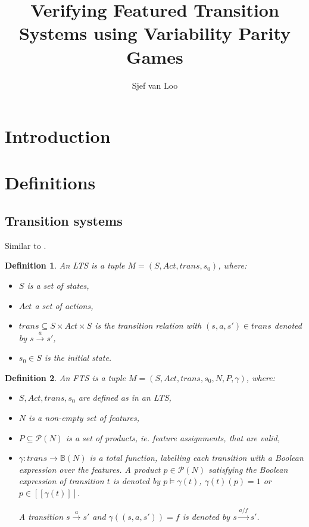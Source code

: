 \documentclass[]{article}
\title{Verifying Featured Transition Systems using Variability Parity Games}
\author{Sjef van Loo}
\newtheorem{definition}{Definition}[section]
\begin{document}
\maketitle

\section{Introduction}


\section{Definitions}
\subsection{Transition systems}
Similar to \cite{Classen2013FeaturedTS}.

\begin{definition}
	\label{def_lts}An LTS is a tuple $M = (S, Act, trans, s_0)$, where:
	\begin{itemize}
		\item $S$ is a set of states,
		\item $Act$ a set of actions,
		\item $trans \subseteq S \times Act \times S$ is the transition relation with $(s,a,s') \in trans$ denoted by $s \xrightarrow a s'$,
		\item $s_0 \in S$ is the initial state.
	\end{itemize}
\end{definition}

\begin{definition}
	\label{def_fts}An FTS is a tuple $M = (S, Act, trans, s_0, N, P, \gamma)$, where:
	\begin{itemize}
		\item $S, Act, trans, s_0$ are defined as in an LTS,
		\item $N$ is a non-empty set of features,
		\item $P \subseteq \mathcal{P}(N)$ is a set of products, ie. feature assignments, that are valid,
		\item $\gamma : trans \rightarrow \mathbb{B}(N)$ is a total function, labelling each transition with a Boolean expression over the features. A product $p \in \mathcal{P}(N)$ satisfying the Boolean expression of transition $t$ is denoted by $p \models \gamma(t)$, $\gamma(t)(p) = 1$ or $p \in [\![\gamma(t)]\!]$. 
		
		A transition $s \xrightarrow a s'$ and $\gamma((s,a,s')) = f$ is denoted by $s \xrightarrow {a / f} s'$. 
	\end{itemize}
\end{definition}
\end{document}
